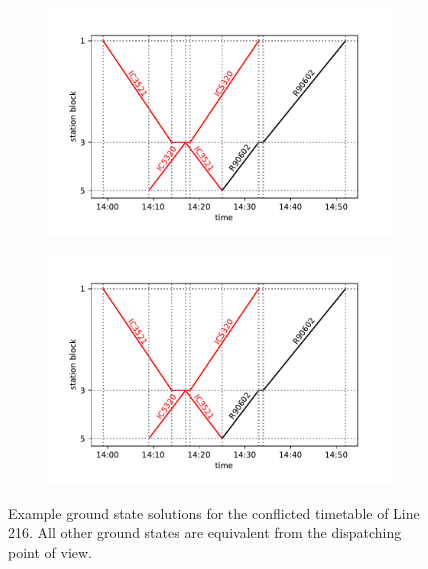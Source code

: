 \begin{figure}[t]
  \begin{subfigure}[b]{0.5\textwidth}
    \caption{}\label{c1}
    \includegraphics[width=\textwidth]{figures/dwave_line216_ground1}
  \end{subfigure}
  \begin{subfigure}[b]{0.5\textwidth}
    \caption{}\label{c2}
    \includegraphics[width=\textwidth]{figures/dwave_line216_ground1.pdf}
  \end{subfigure}
  \caption{Example ground state solutions for the conflicted timetable of Line 216. All
    other ground states are equivalent from the dispatching point of view.}
  \label{fig:dwline216grounds}
\end{figure}

